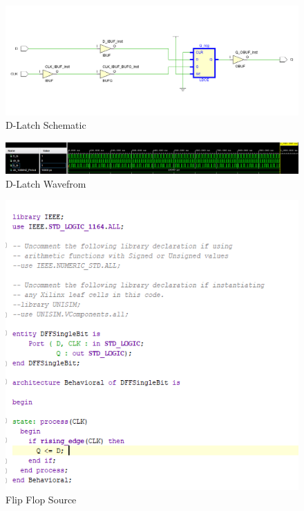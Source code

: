 \documentclass{article}
\begin{document}
\begin{figure}[h]
\begin{center}
\includegraphics[width=1\textwidth]{DLatchDiagram.png} %
\caption{D-Latch Schematic}
\end{center}
\end{figure}


\begin{figure}[h]
\begin{center}
\includegraphics[width=1\textwidth]{DLatchWF.png} %
\caption{D-Latch Wavefrom}
\end{center}
\end{figure}


\begin{figure}[h]
\begin{center}
\includegraphics[width=1\textwidth]{FlipFlopSource.png} %
\caption{Flip Flop Source}
\end{center}
\end{figure}
\end{document}
